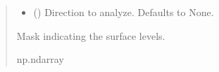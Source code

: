 \documentclass[letterpaper,10pt,english]{sphinxmanual}
\begin{document}
\begin{fulllineitems}
\begin{quote}
\begin{description}
\begin{itemize}
\item {} 
\sphinxAtStartPar
{} (\sphinxstyleliteralemphasis{\sphinxupquote{, }}) \textendash{} Direction to analyze. Defaults to None.

\end{itemize}

\sphinxAtStartPar
Mask indicating the surface levels.

\sphinxAtStartPar
np.ndarray

\end{description}\end{quote}

\end{fulllineitems}

\end{document}
